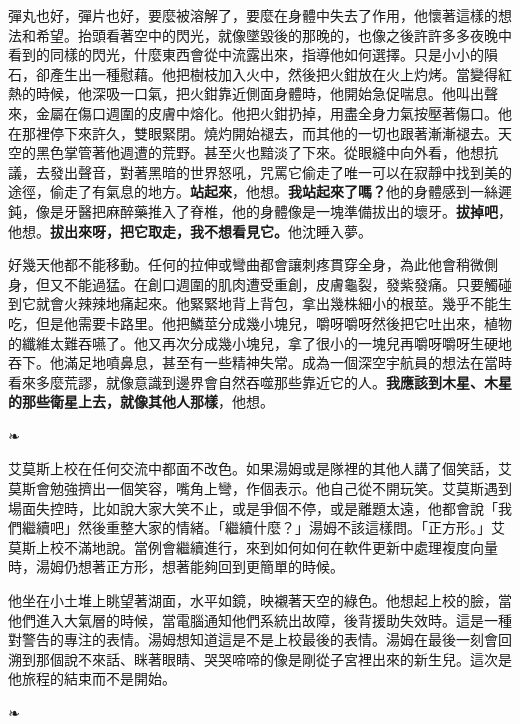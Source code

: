 \documentclass[10pt]{article}
\begin{document}
彈丸也好，彈片也好，要麼被溶解了，要麼在身體中失去了作用，他懷著這樣的想法和希望。抬頭看著空中的閃光，就像墜毀後的那晚的，也像之後許許多多夜晚中看到的同樣的閃光，什麼東西會從中流露出來，指導他如何選擇。只是小小的隕石，卻產生出一種慰藉。他把樹枝加入火中，然後把火鉗放在火上灼烤。當變得紅熱的時候，他深吸一口氣，把火鉗靠近側面身體時，他開始急促喘息。他叫出聲來，金屬在傷口週圍的皮膚中熔化。他把火鉗扔掉，用盡全身力氣按壓著傷口。他在那裡停下來許久，雙眼緊閉。燒灼開始褪去，而其他的一切也跟著漸漸褪去。天空的黑色掌管著他週遭的荒野。甚至火也黯淡了下來。從眼縫中向外看，他想抗議，去發出聲音，對著黑暗的世界怒吼，咒罵它偷走了唯一可以在寂靜中找到美的途徑，偷走了有氣息的地方。\textbf{站起來}，他想。\textbf{我站起來了嗎？}他的身體感到一絲遲鈍，像是牙醫把麻醉藥推入了脊椎，他的身體像是一塊準備拔出的壞牙。\textbf{拔掉吧}，他想。\textbf{拔出來呀，把它取走，我不想看見它。}他沈睡入夢。

好幾天他都不能移動。任何的拉伸或彎曲都會讓刺疼貫穿全身，為此他會稍微側身，但又不能過猛。在創口週圍的肌肉遭受重創，皮膚龜裂，發紫發痛。只要觸碰到它就會火辣辣地痛起來。他緊緊地背上背包，拿出幾株細小的根莖。幾乎不能生吃，但是他需要卡路里。他把鱗莖分成幾小塊兒，嚼呀嚼呀然後把它吐出來，植物的纖維太難吞嚥了。他又再次分成幾小塊兒，拿了很小的一塊兒再嚼呀嚼呀生硬地吞下。他滿足地噴鼻息，甚至有一些精神失常。成為一個深空宇航員的想法在當時看來多麼荒謬，就像意識到邊界會自然吞噬那些靠近它的人。\textbf{我應該到木星、木星的那些衛星上去，就像其他人那樣}，他想。

\begin{center}❧\end{center}

艾莫斯上校在任何交流中都面不改色。如果湯姆或是隊裡的其他人講了個笑話，艾莫斯會勉強擠出一個笑容，嘴角上彎，作個表示。他自己從不開玩笑。艾莫斯遇到場面失控時，比如說大家大笑不止，或是爭個不停，或是離題太遠，他都會說「我們繼續吧」然後重整大家的情緒。「繼續什麼？」湯姆不該這樣問。「正方形。」艾莫斯上校不滿地說。當例會繼續進行，來到如何如何在軟件更新中處理複度向量時，湯姆仍想著正方形，想著能夠回到更簡單的時候。

他坐在小土堆上眺望著湖面，水平如鏡，映襯著天空的綠色。他想起上校的臉，當他們進入大氣層的時候，當電腦通知他們系統出故障，後背援助失效時。這是一種對警告的專注的表情。湯姆想知道這是不是上校最後的表情。湯姆在最後一刻會回溯到那個說不來話、眯著眼睛、哭哭啼啼的像是剛從子宮裡出來的新生兒。這次是他旅程的結束而不是開始。

\begin{center}❧\end{center}
\end{document}
